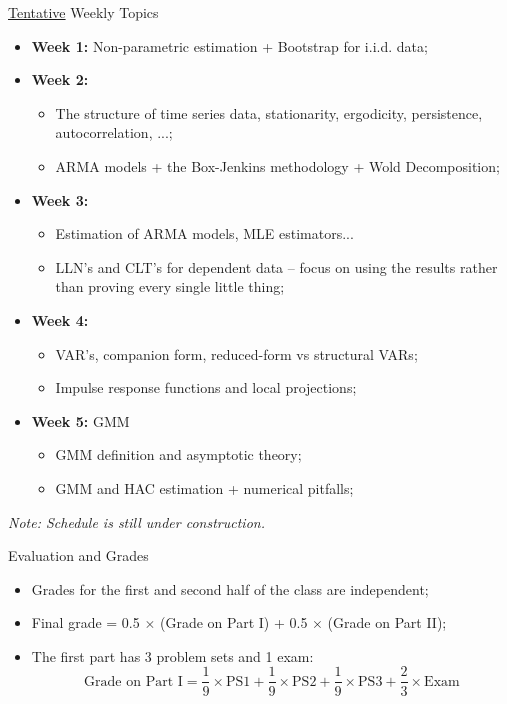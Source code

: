 \documentclass[aspectratio=169, xcolor=dvipsnames, 12pt]{beamer}
\begin{document}
\begin{frame}{\underline{Tentative} Weekly Topics}
  \begin{itemize}
    \item \textbf{Week 1:} Non-parametric estimation + Bootstrap for i.i.d. data;
    \item \textbf{Week 2:}
    \begin{itemize}
      \item The structure of time series data, stationarity, ergodicity, persistence, autocorrelation, ...;
      \item ARMA models + the Box-Jenkins methodology + Wold Decomposition;
    \end{itemize}
    \item \textbf{Week 3:} 
    \begin{itemize}
      \item Estimation of ARMA models, MLE estimators...
      \item LLN's and CLT's for dependent data -- focus on using the results rather than proving every single little thing;
    \end{itemize}
    \item \textbf{Week 4:} 
    \begin{itemize}
      \item VAR's, companion form, reduced-form vs structural VARs;
      \item Impulse response functions and local projections;
    \end{itemize}
    \item \textbf{Week 5:} GMM
    \begin{itemize}
      \item GMM definition and asymptotic theory;
      \item GMM and HAC estimation + numerical pitfalls;
  \end{itemize}
  \end{itemize}
  \vspace{1em}
  \textit{Note: Schedule is still under construction.}
\end{frame}

\begin{frame}{Evaluation and Grades}
  \begin{itemize}
    \item Grades for the first and second half of the class are independent;
    \item Final grade = 0.5 $\times$ (Grade on Part I) + 0.5 $\times$ (Grade on Part II);
    \item The first part has 3 problem sets and 1 exam:
    \begin{equation}
      \text{Grade on Part I} = \frac{1}{9} \times \text{PS1} + \frac{1}{9} \times \text{PS2} + \frac{1}{9} \times \text{PS3} + \frac{2}{3} \times \text{Exam}
    \end{equation}
  \end{itemize}
\end{frame}
\end{document}
